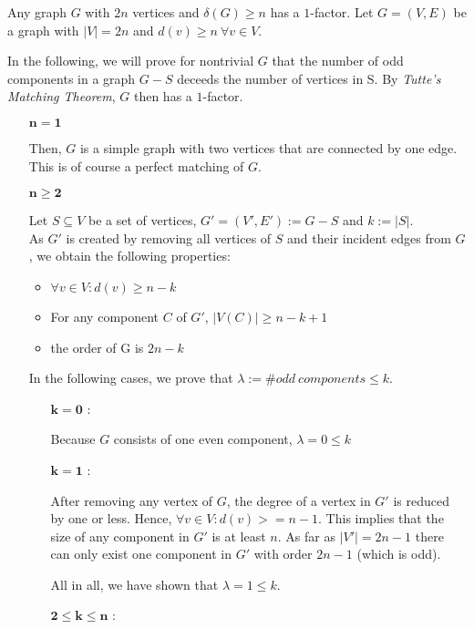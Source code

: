 \documentclass[a4paper]{article}
\begin{document}
	\newpage
	\begin{solution}{12}
		\begin{theorem}{Any graph $G$ with $2n$ vertices and $\delta(G) \geq n$ has a $1$-factor.}
			Let $G=(V,E)$ be a graph with $|V| = 2n$ and $d(v) \geq n \: \forall v \in V$.

			In the following, we will prove for nontrivial $G$ that the number of odd components in a graph $G - S$ deceeds the number of vertices in S. By \emph{Tutte's Matching Theorem}, $G$ then has a $1$-factor.
			\begin{itemize}
				\item [$\mathbf{n = 1}$]

					Then, $G$ is a simple graph with two vertices that are connected by one edge. This is of course a perfect matching of $G$.
			
				\item [$\mathbf{n \geq 2}$]

					Let $S \subseteq V$ be a set of vertices, $G' = (V', E') := G - S$ and $k := |S|$.\\
					As $G'$ is created by removing all vertices of $S$ and their incident edges from $G$, we obtain the following properties: 
					\begin{itemize}
						\item $\forall v \in V: d(v) \geq n - k$
						\item For any component $C$ of $G'$, $|V(C)| \geq n-k+1$
						\item the order of G is $2n-k$
					\end{itemize}
					
					In the following cases, we prove that $\lambda:=\#odd\ components \leq k$.
					\begin{itemize}
						\item[$\mathbf{k=0}$]:

							Because $G$ consists of one even component, $\lambda=0 \leq k$
						\item[$\mathbf{k=1}$]:

							After removing any vertex of $G$, the degree of a vertex in $G'$ is reduced by one or less. Hence, $\forall v \in V: d(v) >= n-1$. This implies that the size of any component in $G'$ is at least $n$. As far as $|V'|=2n-1$ there can only exist one component in $G'$ with order $2n-1$ (which is odd).

							All in all, we have shown that $\lambda=1 \leq k$.
						
						\item[$\mathbf{2\leq k \leq n}$]:


\end{itemize}
\end{itemize}
\end{theorem}
\end{solution}
\end{document}
